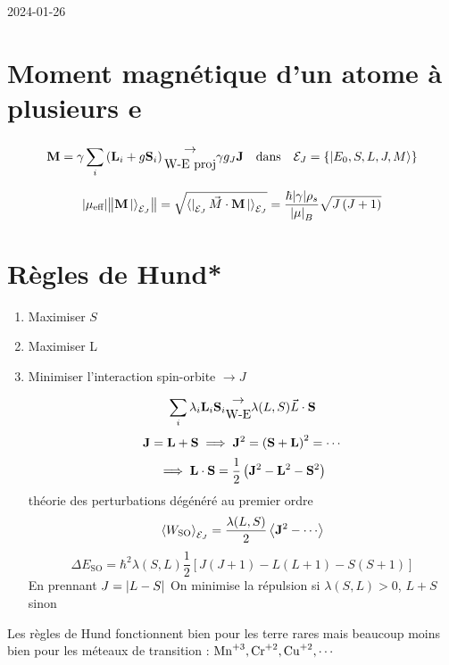 


2024-01-26

\section*{Moment magnétique d'un atome à plusieurs e}

\[ \vb{M} = \gamma \sum_i \left( \vb{L}_i + g \vb{S}_i \right) \begin{matrix}
\to \\ \text{W-E proj}  	
\end{matrix} \gamma g_J \vb{J} \qq{dans} \mathcal{E}_J = \{ \ket{E_0, S, L, J, M} \} \]


\[ \abs{\mu_{\text{eff}} } \norm{\vb{M}\ket{}_{\mathcal{E}_J}} = \sqrt{\bra{}_{\mathcal{E}_J} \vec{M} \cdot \vb{M} \ket{}_{\mathcal{E}_J}} = \frac{\hbar \abs{\gamma} \rho_s }{\abs{\mu}_B } \sqrt{J \left( J+1 \right) } \]


\section{Règles de Hund*}

\begin{enumerate}
	\item Maximiser $S$
	\item Maximiser L
	\item Minimiser l'interaction spin-orbite $\to J$
		\[ \sum_i \lambda_i \vb{L}_i \vb{S}_i \begin{matrix}\to\\ \text{W-E} \end{matrix}\lambda(L,S ) \vec{L}\cdot \vb{S}\]
		\[ \vb{J} = \vb{L} + \vb{S} \implies \vb{J}^2 = \left( \vb{S} + \vb{L} \right)^2 = \dotsb \]
		\[ \implies \vb{L} \cdot \vb{S} = \frac{1}{2} \left( \vb{J}^2 - \vb{L}^2 - \vb{S}^2 \right)  \]
		théorie des perturbations dégénéré au premier ordre 
		\[ \expval{W_{\rm{SO}} }_{\mathcal{E}_J} = \frac{\lambda (L, S)}{2} \expval{\vb{J}^2 - \dotsb} \]
		\[ \Delta E_{\text{SO}}  = \hbar^{2}\lambda(S, L) \frac{1}{2} \left[ J(J+1) - L(L+1) - S(S+1) \right]   \]
		En prennant $J=\abs{L-S} $ On minimise la répulsion si $\lambda(S,L) >0$, $L+S$ sinon
\end{enumerate}

Les règles de Hund fonctionnent bien pour les terre rares mais beaucoup moins bien pour les méteaux de transition : $\rm{Mn}^{+3}, \rm{Cr}^{+2}, \rm{Cu}^{+2}, \dotsb$





